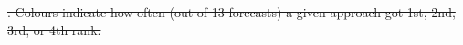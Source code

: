 \documentclass[10pt,a4paper,twocolumn]{article}
\providecommand{\DIFdeltex}[1]{{\protect\color{red}\sout{#1}}}                      %
\providecommand{\DIFdelbegin}{} %
\providecommand{\DIFdelend}{} %
\providecommand{\DIFdelFL}[1]{\DIFdel{#1}} %
\providecommand{\DIFdel}[1]{\texorpdfstring{\DIFdeltex{#1}}{}} %
\begin{document}
\DIFdelbegin %
{%
}
\DIFdelend %



\DIFdelbegin %
{%
}
\DIFdelend %


\DIFdelbegin %
{%
\DIFdelFL{. Colours indicate how often (out of 13 forecasts) a given approach got 1st, 2nd, 3rd, or 4th rank.}}
\DIFdelend %



\DIFdelbegin %
\DIFdelend %
\end{document}

